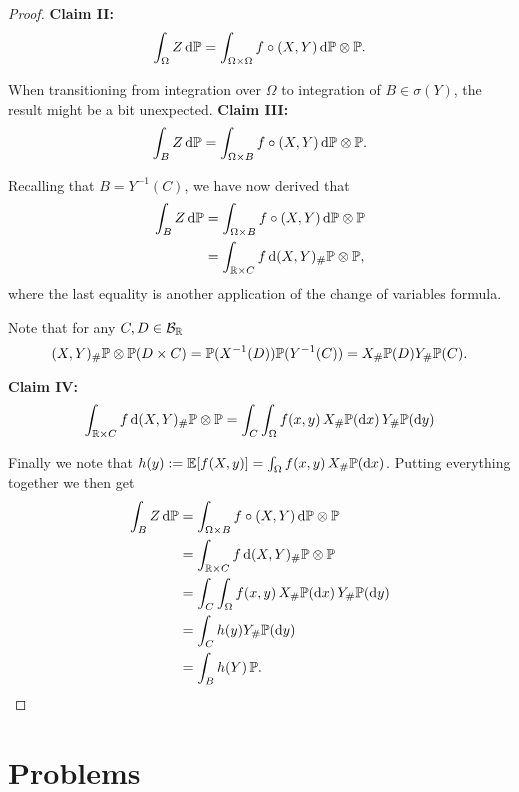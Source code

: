 \begin{proof}
\textbf{Claim II:}
\[
	\int_\Omega Z \, \mathrm{d} \mathbb P = \int_{\Omega \times \Omega} f \circ (X,Y) \, \mathrm{d} \mathbb P \otimes \mathbb P.
\]


When transitioning from integration over $\Omega$ to integration of $B \in \sigma(Y)$, the result might be a bit unexpected.
\textbf{Claim III:}
\[
	\int_{B} Z \, \mathrm{d} \mathbb P = \int_{\Omega \times B} f \circ (X,Y) \, \mathrm{d} \mathbb P \otimes \mathbb P.
\]

Recalling that $B = Y^{-1}(C)$, we have now derived that
\begin{align*}
	\int_{B} Z \, \mathrm{d} \mathbb P &= \int_{\Omega \times B} f \circ (X,Y) \, \mathrm{d} \mathbb P \otimes \mathbb P\\
	&= \int_{\mathbb R \times C} f \, \mathrm{d} (X,Y)_\# \mathbb P \otimes \mathbb P,
\end{align*}
where the last equality is another application of the change of variables formula.

Note that for any $C, D \in \mathcal B_{\mathbb R}$
\[
	(X,Y)_\# \mathbb P \otimes \mathbb P(D \times C) = \mathbb P(X^{-1}(D)) \mathbb P(Y^{-1}(C)) 
	= X_\# \mathbb P(D) Y_\# \mathbb P(C).
\]

\textbf{Claim IV:}
\[
	\int_{\mathbb R \times C} f \, \mathrm{d} (X,Y)_\# \mathbb P \otimes \mathbb P
	= \int_C \int_\Omega f(x,y) \, X_\#\mathbb P(\mathrm{d} x) \, Y_\# \mathbb P (\mathrm{d} y)
\]

Finally we note that $h(y) := \mathbb E[f(X,y)] = \int_\Omega f(x,y) \, X_\#\mathbb P(\mathrm{d} x)$. Putting everything together we then get
\begin{align*}
	\int_{B} Z \, \mathrm{d} \mathbb P &= \int_{\Omega \times B} f \circ (X,Y) \, \mathrm{d} \mathbb P \otimes \mathbb P\\
	&= \int_{\mathbb R \times C} f \, \mathrm{d} (X,Y)_\# \mathbb P \otimes \mathbb P\\
	&= \int_C \int_\Omega f(x,y) \, X_\#\mathbb P(\mathrm{d} x) \, Y_\# \mathbb P (\mathrm{d} y)\\
	&= \int_C h(y) Y_\# \mathbb P(\mathrm{d} y) \\
	&= \int_B h(Y) \, \mathbb P.
\end{align*}

\end{proof}


\section{Problems}


